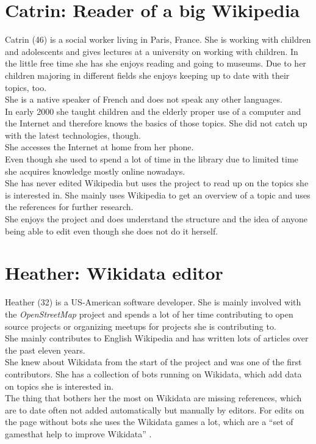 \section{Catrin: Reader of a big Wikipedia}
Catrin (46) is a social worker living in Paris, France. She is working with children and adolescents and gives lectures at a university on working with children. In the little free time she has she enjoys reading and going to museums. Due to her children majoring in different fields she enjoys keeping up to date with their topics, too. \\
She is a native speaker of French and does not speak any other languages. \\
In early 2000 she taught children and the elderly proper use of a computer and the Internet and therefore knows the basics of those topics. She did not catch up with the latest technologies, though. \\
She accesses the Internet at home from her phone. \\
Even though she used to spend a lot of time in the library due to limited time she acquires knowledge mostly online nowadays. \\
She has never edited Wikipedia but uses the project to read up on the topics she is interested in. She mainly uses Wikipedia to get an overview of a topic and uses the references for further research. \\
She enjoys the project and does understand the structure and the idea of anyone being able to edit even though she does not do it herself. \\


\section{Heather: Wikidata editor}
Heather (32) is a US-American software developer. She is mainly involved with the \textit{OpenStreetMap} project and spends a lot of her time contributing to open source projects or organizing meetups for projects she is contributing to. \\
She mainly contributes to English Wikipedia and has written lots of articles over the past eleven years. \\
She knew about Wikidata from the start of the project and was one of the first contributors. She has a collection of bots running on Wikidata, which add data on topics she is interested in. \\
The thing that bothers her the most on Wikidata are missing references, which are to date often not added automatically but manually by editors. For edits on the page without bots she uses the Wikidata games a lot, which are a ``set of \frqq games\flqq that help to improve Wikidata'' \citep{wikidatagame}.
